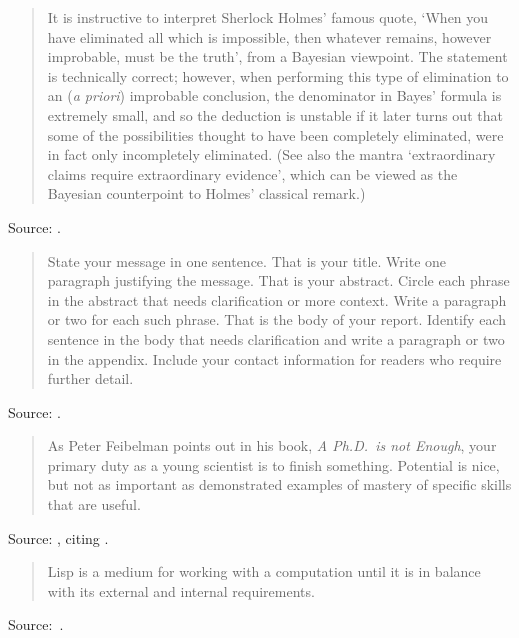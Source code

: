 \documentclass[a4paper]{article}
\begin{document}
\begin{quote}
	It is instructive to interpret Sherlock Holmes' famous quote,
	`When you have eliminated all which is impossible, then whatever
	remains, however improbable, must be the truth', from a Bayesian
	viewpoint. The statement is technically correct; however, when
	performing this type of elimination to an ({\it a priori}) improbable
	conclusion, the denominator in Bayes' formula is extremely small,
	and so the deduction is unstable if it later turns out that some
	of the possibilities thought to have been completely eliminated,
	were in fact only incompletely eliminated. (See also the mantra
	`extraordinary claims require extraordinary evidence', which
	can be viewed as the Bayesian counterpoint to Holmes' classical
	remark.)
\end{quote}
Source: \citet{Tao2010}.
\medskip

\begin{quote}
	State your message in one sentence. That is your title. Write one
	paragraph justifying the message. That is your abstract. Circle
	each phrase in the abstract that needs clarification or more
	context. Write a paragraph or two for each such phrase. That
	is the body of your report. Identify each sentence in the body
	that needs clarification and write a paragraph or two in the
	appendix. Include your contact information for readers who
	require further detail.
\end{quote}
Source: \citet{Wood2005}.
\medskip

\begin{quote}
	As Peter Feibelman points out in his book, {\it A Ph.D.\ is not
	Enough}, your primary duty as a young scientist is to finish something.
	Potential is nice, but not as important as demonstrated examples
	of mastery of specific skills that are useful.
\end{quote}
Source: \citet{RYS2010b}, citing \citet{Feibelman1993}.
\medskip

\begin{quote}
	Lisp is a medium for working with a computation until it is
	in balance with its external and internal requirements. 
\end{quote}
Source:~\citet[Foreword]{Lamkins2005}.
\medskip
\end{document}
